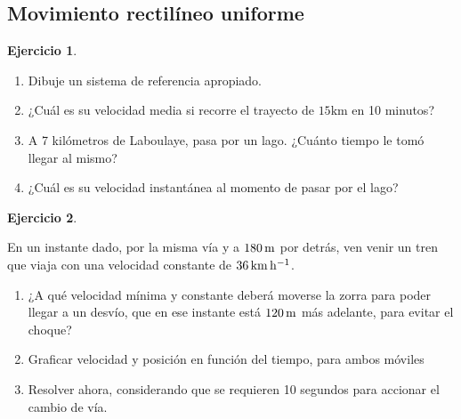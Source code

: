 \documentclass[a4paper,12pt,twoside]{book}
\newtheorem{ejercicio}{{Ejercicio}}[chapter]
\begin{document}
\subsection{Movimiento rectilíneo uniforme}

\begin{mdframed}[style=ejercicio-facil]
    \begin{ejercicio}
    \end{ejercicio}
    \begin{enumerate}
        \item Dibuje un sistema de referencia apropiado.
        \item ¿Cuál es su velocidad media si recorre el trayecto de $15 \si{\kilo\metre}$ en 10 minutos?
        \item A 7 kilómetros de Laboulaye, pasa por un lago. ¿Cuánto tiempo le tomó llegar al mismo?
        \item ¿Cuál es su velocidad instantánea al momento de pasar por el lago?
    \end{enumerate}
\end{mdframed}

\begin{mdframed}[style=ejercicio-facil]
    \begin{ejercicio}
    \end{ejercicio}
    En un instante dado, por la misma vía y a $180\,\si{\metre}$ por detrás, ven venir un tren que viaja con una velocidad constante de $36\,\si{\kilo\metre\per\hour}$.
    \begin{enumerate}
        \item ¿A qué velocidad mínima y constante deberá moverse la zorra para poder llegar a un desvío, que en ese instante está $120\,\si{\metre}$ más adelante, para evitar el choque?
        \item Graficar velocidad y posición en función del tiempo, para ambos móviles
        \item Resolver ahora, considerando que se requieren 10 segundos para accionar el cambio de vía.
    \end{enumerate}
\end{mdframed}
\end{document}
